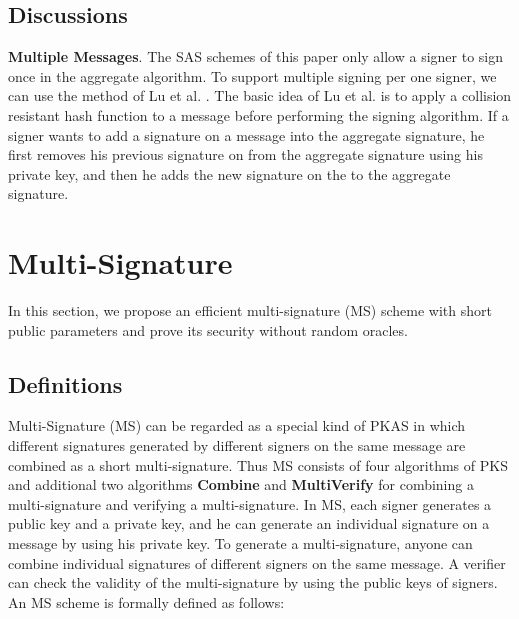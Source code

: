\documentclass[11pt,letterpaper]{article}
\newcommand{\tb}[1]{\textbf{#1}}
\begin{document}
\subsection{Discussions}

\noindent \textbf{Multiple Messages}. The SAS schemes of this paper only
allow a signer to sign once in the aggregate algorithm. To support multiple
signing per one signer, we can use the method of Lu et al. \cite{LuOSSW06}.
The basic idea of Lu et al. is to apply a collision resistant hash function
 to a message  before performing the signing algorithm. If a signer
wants to add a signature on a message  into the aggregate signature, he
first removes his previous signature on  from the aggregate signature
using his private key, and then he adds the new signature on the
 to the aggregate signature.

\section{Multi-Signature} \label{sec:ms}

In this section, we propose an efficient multi-signature (MS) scheme with
short public parameters and prove its security without random oracles.

\subsection{Definitions}

Multi-Signature (MS) can be regarded as a special kind of PKAS in which
different signatures generated by different signers on the same message are
combined as a short multi-signature. Thus MS consists of four algorithms of
PKS and additional two algorithms \tb{Combine} and \tb{MultiVerify} for
combining a multi-signature and verifying a multi-signature. In MS, each
signer generates a public key and a private key, and he can generate an
individual signature on a message by using his private key. To generate a
multi-signature, anyone can combine individual signatures of different
signers on the same message. A verifier can check the validity of the
multi-signature by using the public keys of signers. An MS scheme is formally
defined as follows:
\end{document}

